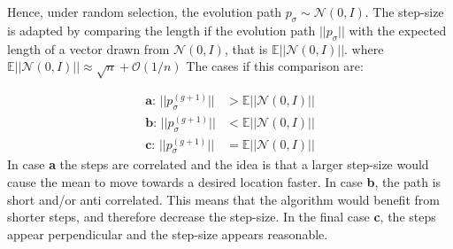 Hence, under random selection, the evolution path $p_\sigma \sim \mathcal{N} 
\left( 0, I \right)$.  The step-size is adapted by comparing the length
if the evolution path $||p_\sigma||$ with the expected length of a vector 
drawn from $\mathcal{N} \left( 0, I \right)$, that is
$\mathbb{E}||\mathcal{N}\left(0, I\right)||$. where 
$\mathbb{E}||\mathcal{N}\left(0, I\right)|| \approx \sqrt{n} + \mathcal{O}\left(1/n\right)$
The cases if this comparison are:

\begin{align}
\textbf{a: } ||p_\sigma^{(g+1)}|| &> \mathbb{E}||\mathcal{N}\left(0, I\right)|| 
\label{case1}\\
\textbf{b: } ||p_\sigma^{(g+1)}|| &< \mathbb{E}||\mathcal{N}\left(0, I\right)||
\label{case2}\\
\textbf{c: } ||p_\sigma^{(g+1)}|| &= \mathbb{E}||\mathcal{N}\left(0, I\right)||\label{case3}
\end{align}
In case \textbf{a} the steps are correlated and the idea is that a larger step-size
would cause the mean to move towards a desired location faster. In case \textbf{b},
the path is short and/or anti correlated. This means that the algorithm would benefit from
shorter steps, and therefore decrease the step-size. In the final case \textbf{c}, the 
steps appear perpendicular and the step-size appears reasonable.
